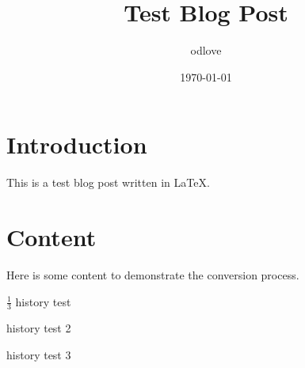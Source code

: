 \documentclass{article}
\begin{document}
\title{Test Blog Post}
\author{odlove}
\date{\today}
\maketitle

\section{Introduction}

This is a test blog post written in \LaTeX.

\section{Content}

Here is some content to demonstrate the conversion process.


$\frac{1}{3}$
history test

history test 2

history test 3
\end{document}

